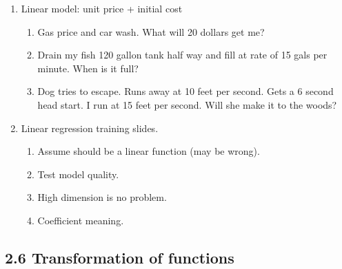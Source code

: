 \documentclass{article}
\begin{document}
\begin{enumerate}
\item Linear model: unit price + initial cost
\begin{enumerate}
\item Gas price and car wash. What will 20 dollars get me?
\item Drain my fish 120 gallon tank half way and fill at rate of 15 gals per minute. When is it full?
\item Dog tries to escape. Runs away at 10 feet per second. Gets a 6 second head start. I run at 15 feet per second. Will she make it to the woods?
\end{enumerate}

\item Linear regression training slides. 
\begin{enumerate}
\item Assume should be a linear function (may be wrong).
\item Test model quality.
\item High dimension is no problem.
\item Coefficient meaning.
\end{enumerate}

\end{enumerate}


\subsection{2.6 Transformation of functions}
\end{document}
